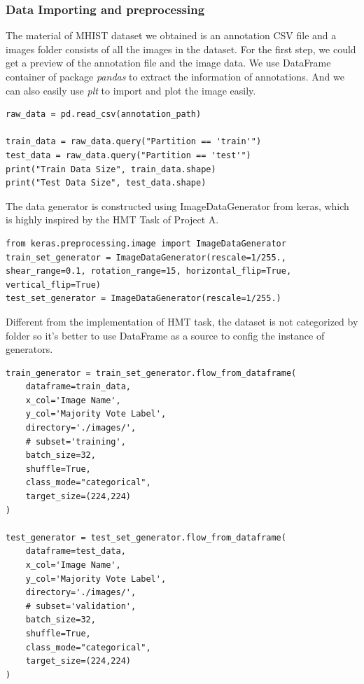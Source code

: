 \documentclass[conference]{IEEEtran}
\begin{document}
\subsubsection{Data Importing and preprocessing}

The material of MHIST dataset we obtained is an annotation CSV file and a images folder consists of all the images in the dataset. For the first step, we could get a preview of the annotation file and the image data. We use DataFrame container of package \textit{pandas} to extract the information of annotations. And we can also easily use \textit{plt} to import and plot the image easily.

\begin{lstlisting}
raw_data = pd.read_csv(annotation_path)

train_data = raw_data.query("Partition == 'train'")
test_data = raw_data.query("Partition == 'test'")
print("Train Data Size", train_data.shape)
print("Test Data Size", test_data.shape)
\end{lstlisting}

The data generator is constructed using ImageDataGenerator from keras, which is highly inspired by the HMT Task of Project A.
\begin{lstlisting}
from keras.preprocessing.image import ImageDataGenerator
train_set_generator = ImageDataGenerator(rescale=1/255., shear_range=0.1, rotation_range=15, horizontal_flip=True, vertical_flip=True)
test_set_generator = ImageDataGenerator(rescale=1/255.)
\end{lstlisting}

Different from the implementation of HMT task, the dataset is not categorized by folder so it's better to use DataFrame as a source to config the instance of generators.

\begin{lstlisting}
train_generator = train_set_generator.flow_from_dataframe(
    dataframe=train_data,
    x_col='Image Name',
    y_col='Majority Vote Label',
    directory='./images/',
    # subset='training',
    batch_size=32,
    shuffle=True,
    class_mode="categorical",
    target_size=(224,224)
)

test_generator = test_set_generator.flow_from_dataframe(
    dataframe=test_data,
    x_col='Image Name',
    y_col='Majority Vote Label',
    directory='./images/',
    # subset='validation',
    batch_size=32,
    shuffle=True,
    class_mode="categorical",
    target_size=(224,224)
)
\end{lstlisting}
\end{document}
